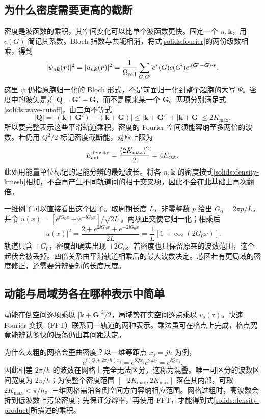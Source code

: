 \subsection{为什么密度需要更高的截断}
密度是波函数的乘积，其空间变化可以比单个波函数更快。固定一个 $n,\bm k$，用 $c(G)$ 简记其系数。Bloch 指数与共轭相消，将式\eqref{solids:fourier}的两份级数相乘，得到
\begin{equation}\label{solids:density-product}
|\psi_{n\bm k}(\bm r)|^2=|u_{n\bm k}(\bm r)|^2
=\frac1{\Omega_{\rm cell}}\sum_{G,G'}c^*(G)c(G')
e^{\mathrm{i}(\bm G'-\bm G)\cdot\bm r}.
\end{equation}
这里 $\psi$ 仍指原胞归一化的 Bloch 形式，不是前面归一化到整个超胞的大写 $\Psi$。密度中的波矢是差 $\bm Q=\bm G'-\bm G$，而不是原来某一个 $\bm G$。两项分别满足式\eqref{solids:wave-cutoff}，由三角不等式
\begin{equation}
|\bm Q|=|(\bm k+\bm G')-(\bm k+\bm G)|
\le|\bm k+\bm G'|+|\bm k+\bm G|\le2K_{\max}.
\end{equation}
所以要完整表示这些平滑轨道乘积，密度的 Fourier 空间须能容纳至多两倍的波数。若仍用 $Q^2/2$ 标记密度截断能，对应上限为
\begin{equation}\label{solids:density-cutoff}
E_{\rm cut}^{\rm density}=\frac{(2K_{\max})^2}{2}=4E_{\rm cut}.
\end{equation}
此处用能量单位标记的是能分辨的最短波长。将各 $n,\bm k$ 的密度按式\eqref{solids:density-kmesh}相加，不会再产生不同轨道间的相干交叉项，因此不会在此基础上再次翻倍。

一维例子可以直接看出这个因子。取周期长度 $L$，非零整数 $p$ 给出 $G_0=2\pi p/L$，并令 $u(x)=[e^{\ii G_0x}+e^{-\ii G_0x}]/\sqrt{2L}$。两项正交使它归一化；相乘后
\begin{equation}
|u(x)|^2=\frac{2+e^{2\ii G_0x}+e^{-2\ii G_0x}}{2L}
=\frac1L[1+\cos(2G_0x)].
\end{equation}
轨道只含 $\pm G_0$，密度却确实出现 $\pm2G_0$。若密度也只保留原来的波数范围，这个起伏会被丢掉。四倍关系由平滑轨道相乘后的最大波数决定。芯区若有更局域的密度修正，还需要分辨更短的长度尺度。

\subsection{动能与局域势各在哪种表示中简单}
动能在倒空间逐项乘以 $|\bm k+\bm G|^2/2$，局域势在实空间逐点乘以 $v_s(\bm r)$。快速 Fourier 变换（FFT）联系同一轨道的两种表示。乘法虽可在格点上完成，格点究竟能辨认多快的振荡仍由其间距决定。

为什么太粗的网格会歪曲密度？以一维等距点 $x_j=jh$ 为例，
\begin{equation}
e^{\ii(Q+2\pi/h)x_j}=e^{\ii Qx_j}e^{2\pi\ii j}=e^{\ii Qx_j}.
\end{equation}
因此相差 $2\pi/h$ 的波数在网格上完全无法区分，这称为混叠。唯一可区分的波数区间宽度为 $2\pi/h$；为使整个密度范围 $[-2K_{\max},2K_{\max}]$ 落在其内部，可取 $2K_{\max}<\pi/h$。三维网格需沿各倒空间方向容纳相应范围。网格过粗时，高波数会折到低波数上污染密度；先保证分辨率，再使用 FFT，才能得到式\eqref{solids:density-product}所描述的乘积。

